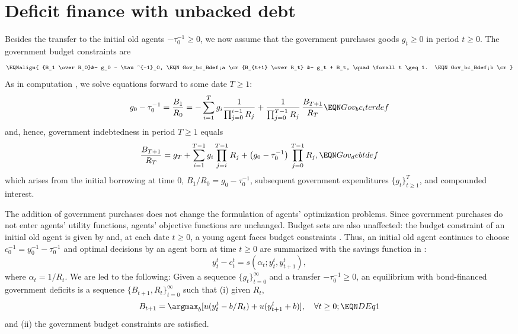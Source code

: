 \section{Deficit finance with unbacked debt}
Besides the transfer to the initial old agents $-\tau^{-1}_0\geq 0$,
we now assume that the government purchases goods $g_t\geq 0$ in
period $t\geq 0$. The government budget constraints are 
$$\EQNalign{ {B_1 \over R_0}&= g_0 - \tau^{-1}_0,    \EQN Gov_bc_Bdef;a \cr
        {B_{t+1} \over R_t} &= g_t + B_t,  \quad \forall t \geq 1. 
                                                  \EQN Gov_bc_Bdef;b \cr} $$
As in computation , we solve equations  
forward to some date $T\geq 1$:
$$ g_0-\tau^{-1}_0 = {B_1 \over R_0}
= - \sum_{i=1}^T g_i {1 \over \prod_{j=0}^{i-1} R_j} 
+  {1 \over \prod_{j=0}^{T-1} R_j}\, {B_{T+1} \over R_{T} } \EQN Gov_bc_iterdef
$$
and, hence, government indebtedness in period $T\geq 1$ equals
$$ {B_{T+1} \over R_{T} } = g_T + \sum_{i=1}^{T-1} g_i \prod_{j=i}^{T-1} R_j 
+ \left(g_0-\tau^{-1}_0\right) \, \prod_{j=0}^{T-1} R_j , \EQN Gov_debtdef
$$
which arises from the initial borrowing at time 0, $B_1/R_0=g_0-\tau^{-1}_0$,
subsequent government expenditures $\{g_t\}_{t\geq 1}^{T}$, and compounded 
interest.

The addition of government purchases does not change the 
formulation of agents' optimization problems. Since government 
purchases do not enter agents' utility functions, agents' objective functions are
unchanged. Budget sets are also unaffected: 
the budget constraint of an initial old agent is given by 
 and, at each date $t\geq 0$, a young agent faces 
budget constraints . Thus, an initial old agent
continues to choose $c^{-1}_0=y^{-1}_0 - \tau^{-1}_0$ and
optimal decisions by an agent born at time $t\geq 0$ are summarized
with the savings function in :
$$ y_t^t - c_t^t = s(\alpha_t; y_t^t, y_{t+1}^t),$$
where $\alpha_t=1/R_t$. We are led to the following:
\medskip
{}  Given a sequence 
$\{g_t\}_{t=0}^\infty$ and a transfer 
$-\tau^{-1}_0\geq 0$, an equilibrium with bond-financed 
government deficits is a sequence 
$\{B_{t+1}, R_t\}_{t=0}^\infty$ such that 
(i) given $R_t$,
$$ B_{t+1} = \argmax_{b} [ u(y_t^t - b/R_t)
    + u(y^t_{t+1} + b)],  \quad \forall t \geq 0; \EQN DEq1$$
and (ii) the government budget constraints 
are satisfied.

\medskip

